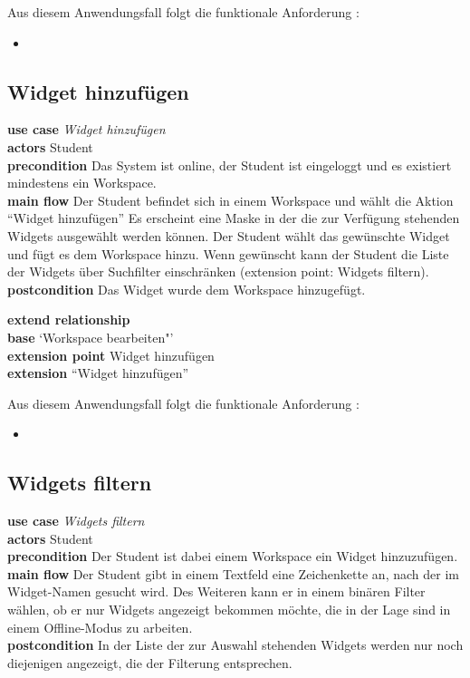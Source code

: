 Aus diesem Anwendungsfall folgt die funktionale Anforderung :
\begin{itemize}
 \item \requirement{\requirementWorkspaceDelete}\label{requirementWorkspaceDelete}
\end{itemize}

\subsection{Widget hinzufügen}
\textbf{use case} \emph{Widget hinzufügen}\\
\textbf{actors} Student\\
\textbf{precondition} Das System ist online, der Student ist eingeloggt und es existiert mindestens ein Workspace.\\
\textbf{main flow} Der Student befindet sich in einem Workspace und wählt die Aktion "`Widget hinzufügen"' Es erscheint eine Maske in der die zur Verfügung stehenden Widgets ausgewählt werden können. Der Student wählt das gewünschte Widget und fügt es dem Workspace hinzu. Wenn gewünscht kann der Student die Liste der Widgets über Suchfilter einschränken (extension point: Widgets filtern).\\
\textbf{postcondition} Das Widget wurde dem Workspace hinzugefügt.

\textbf{extend relationship}\\
\textbf{base} `Workspace bearbeiten"'\\
\textbf{extension point} Widget hinzufügen\\
\textbf{extension} "`Widget hinzufügen"'

Aus diesem Anwendungsfall folgt die funktionale Anforderung :
\begin{itemize}
 \item \requirement{\requirementWidgetAdd}\label{requirementWidgetAdd}
\end{itemize}

\subsection{Widgets filtern}
\textbf{use case} \emph{Widgets filtern}\\
\textbf{actors} Student\\
\textbf{precondition} Der Student ist dabei einem Workspace ein Widget hinzuzufügen.\\
\textbf{main flow} Der Student gibt in einem Textfeld eine Zeichenkette an, nach der im Widget-Namen gesucht wird. Des Weiteren kann er in einem binären Filter wählen, ob er nur Widgets angezeigt bekommen möchte, die in der Lage sind in einem Offline-Modus zu arbeiten.\\
\textbf{postcondition} In der Liste der zur Auswahl stehenden Widgets werden nur noch diejenigen angezeigt, die der Filterung entsprechen.
 
